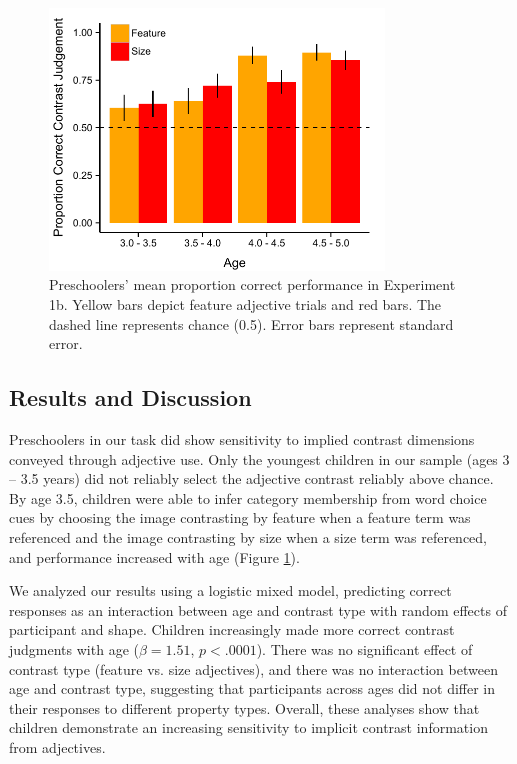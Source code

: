 \documentclass[10pt,letterpaper]{article}
\begin{document}
\begin{figure}[t] 
  \begin{center} 
    \includegraphics[width=3.5in]{figures/experiment1bResults.pdf} 
    \caption{\label{fig:kids1} Preschoolers' mean proportion correct performance in Experiment 1b. Yellow bars depict feature adjective trials and red bars. The dashed line represents chance (0.5). Error bars represent standard error.}
  \end{center} 
\end{figure}	




\subsection{Results and Discussion}

Preschoolers in our task did show sensitivity to implied contrast dimensions conveyed through adjective use.  Only the youngest children in our sample (ages 3 -- 3.5 years) did not reliably select the adjective contrast reliably above chance.  By age 3.5, children were able to infer category membership from word choice cues by choosing the image contrasting by feature when a feature term was referenced and the image contrasting by size when a size term was referenced, and performance increased with age (Figure \ref{fig:kids1}).


We analyzed our results using a logistic mixed model, predicting correct responses as an interaction between age and contrast type with random effects of participant and shape.  Children increasingly made more correct contrast judgments with age ($\beta = 1.51$, $p < .0001$).
  There was no significant effect of contrast type (feature vs. size adjectives), and there was no interaction between age and contrast type, suggesting that participants across ages did not differ in their responses to different property types.  Overall, these analyses show that children demonstrate an increasing sensitivity to implicit contrast information from adjectives.  
\end{document}

